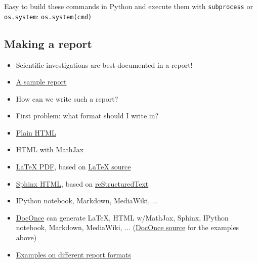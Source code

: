 \documentclass[%
oneside,                 %
final,                   %
10pt]{article}
\begin{document}
Easy to build these commands in Python and execute them with \texttt{subprocess}
or \texttt{os.system}: \texttt{os.system(cmd)}


\subsection*{Making a report}
\label{decay:exper:report}

\begin{itemize}
 \item Scientific investigations are best documented in a report!

 \item \href{{http://hplgit.github.com/INF5620/doc/writing_reports/sphinx-cloud/}}{A sample report}

 \item How can we write such a report?

 \item First problem: what format should I write in?

 \item \href{{http://tinyurl.com/nc4upel/_static/report_html.html}}{Plain HTML}

 \item \href{{http://tinyurl.com/nc4upel/_static/report_html_mathjax.html}}{HTML with MathJax}

 \item \href{{http://tinyurl.com/nc4upel/_static/report.pdf}}{LaTeX PDF}, based on \href{{http://tinyurl.com/nc4upel/_static/report.tex.html}}{LaTeX source}

 \item \href{{http://tinyurl.com/nc4upel/_static/sphinx-cloud/index.html}}{Sphinx HTML}, based on \href{{http://tinyurl.com/nc4upel/_static/report_sphinx.rst.html}}{reStructuredText}

 \item IPython notebook, Markdown, MediaWiki, ...

 \item \href{{https://github.com/hplgit/doconce}}{DocOnce} can generate {\LaTeX}, HTML w/MathJax, Sphinx, IPython notebook, Markdown, MediaWiki, ... (\href{{http://tinyurl.com/nc4upel/_static/report.do.txt.html}}{DocOnce source} for the examples above)

 \item \href{{http://hplgit.github.com/INF5620/doc/writing_reports/}}{Examples on different report formats}
\end{itemize}
\end{document}
